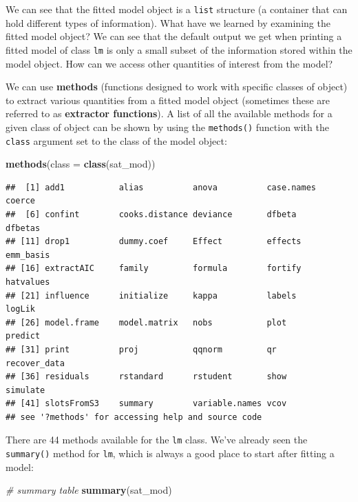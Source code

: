 \documentclass[
]{book}
\newenvironment{Shaded}{\begin{snugshade}}{\end{snugshade}}
\newcommand{\CommentTok}[1]{\textcolor[rgb]{0.56,0.35,0.01}{\textit{#1}}}
\newcommand{\DataTypeTok}[1]{\textcolor[rgb]{0.13,0.29,0.53}{#1}}
\newcommand{\KeywordTok}[1]{\textcolor[rgb]{0.13,0.29,0.53}{\textbf{#1}}}
\newcommand{\NormalTok}[1]{#1}
\begin{document}
We can see that the fitted model object is a \texttt{list} structure (a container that can hold different types of information). What have we learned by examining the fitted model object? We can see that the default output we get when printing a fitted model of class \texttt{lm} is only a small subset of the information stored within the model object. How can we access other quantities of interest from the model?

We can use \textbf{methods} (functions designed to work with specific classes of object) to extract various quantities from a fitted model object (sometimes these are referred to as \textbf{extractor functions}). A list of all the available methods for a given class of object can be shown by using the \texttt{methods()} function with the \texttt{class} argument set to the class of the model object:

\begin{Shaded}
\begin{Highlighting}[]
\KeywordTok{methods}\NormalTok{(}\DataTypeTok{class =} \KeywordTok{class}\NormalTok{(sat\_mod))}
\end{Highlighting}
\end{Shaded}

\begin{verbatim}
##  [1] add1           alias          anova          case.names     coerce        
##  [6] confint        cooks.distance deviance       dfbeta         dfbetas       
## [11] drop1          dummy.coef     Effect         effects        emm_basis     
## [16] extractAIC     family         formula        fortify        hatvalues     
## [21] influence      initialize     kappa          labels         logLik        
## [26] model.frame    model.matrix   nobs           plot           predict       
## [31] print          proj           qqnorm         qr             recover_data  
## [36] residuals      rstandard      rstudent       show           simulate      
## [41] slotsFromS3    summary        variable.names vcov          
## see '?methods' for accessing help and source code
\end{verbatim}

There are 44 methods available for the \texttt{lm} class. We've already seen the \texttt{summary()} method for \texttt{lm}, which is always a good place to start after fitting a model:

\begin{Shaded}
\begin{Highlighting}[]
  \CommentTok{\# summary table}
  \KeywordTok{summary}\NormalTok{(sat\_mod) }
\end{Highlighting}
\end{Shaded}
\end{document}
